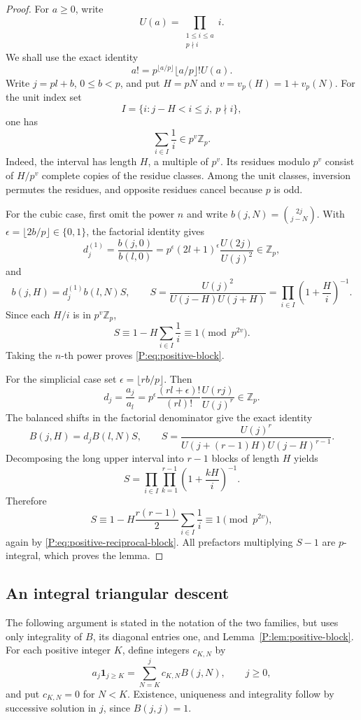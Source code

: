 \documentclass[11pt,a4paper]{article}
\theoremstyle{definition}\newtheorem{definition}[theorem]{Definition}
\theoremstyle{remark}\newtheorem{remark}[theorem]{Remark}
\numberwithin{equation}{section}
\begin{document}
\begin{proof}
For \(a\geq0\), write
\[
 U(a)=\prod_{\substack{1\leq i\leq a\\p\nmid i}}i.
\]
We shall use the exact identity
\[
 a!=p^{\lfloor a/p\rfloor}\lfloor a/p\rfloor!U(a).
\]
Write \(j=pl+b\), \(0\leq b<p\), and put \(H=pN\) and
\(v=v_p(H)=1+v_p(N)\).
For the unit index set
\[
 I=\{i:j-H<i\leq j,\ p\nmid i\},
\]
one has
\begin{equation}\label{P:eq:positive-reciprocal-block}
 \sum_{i\in I}\frac1i\in p^v\mathbb Z_p.
\end{equation}
Indeed, the interval has length \(H\), a multiple of \(p^v\).
Its residues modulo \(p^v\) consist of \(H/p^v\) complete
copies of the residue classes.  Among the unit classes, inversion
permutes the residues, and opposite residues cancel because
\(p\) is odd.

For the cubic case, first omit the power \(n\) and write
\(b(j,N)=\binom{2j}{j-N}\).
With \(\epsilon=\lfloor2b/p\rfloor\in\{0,1\}\), the
factorial identity gives
\[
 d_j^{(1)}=\frac{b(j,0)}{b(l,0)}
 =p^\epsilon(2l+1)^\epsilon\frac{U(2j)}{U(j)^2}
 \in\mathbb Z_p,
\]
and
\[
 b(j,H)=d_j^{(1)}b(l,N)S,\qquad
 S=\frac{U(j)^2}{U(j-H)U(j+H)}
   =\prod_{i\in I}\left(1+\frac H i\right)^{-1}.
\]
Since each \(H/i\) is in \(p^v\mathbb Z_p\),
\[
 S\equiv1-H\sum_{i\in I}\frac1i\equiv1\pmod{p^{2v}}.
\]
Taking the \(n\)-th power proves \eqref{P:eq:positive-block}.

For the simplicial case set \(\epsilon=\lfloor rb/p\rfloor\).
Then
\[
 d_j=\frac{a_j}{a_l}
 =p^\epsilon\frac{(rl+\epsilon)!}{(rl)!}
             \frac{U(rj)}{U(j)^r}\in\mathbb Z_p.
\]
The balanced shifts in the factorial denominator give the exact
identity
\[
 B(j,H)=d_jB(l,N)S,\qquad
 S=\frac{U(j)^r}
 {U(j+(r-1)H)U(j-H)^{r-1}}.
\]
Decomposing the long upper interval into \(r-1\) blocks of
length \(H\) yields
\[
 S=\prod_{i\in I}\prod_{k=1}^{r-1}
          \left(1+\frac{kH}{i}\right)^{-1}.
\]
Therefore
\[
 S\equiv
 1-H\frac{r(r-1)}2\sum_{i\in I}\frac1i
 \equiv1\pmod{p^{2v}},
\]
again by \eqref{P:eq:positive-reciprocal-block}.
All prefactors multiplying \(S-1\) are \(p\)-integral,
which proves the lemma.
\end{proof}

\subsection{An integral triangular descent}

The following argument is stated in the notation of the two
families, but uses only integrality of \(B\), its diagonal entries
one, and Lemma~\ref{P:lem:positive-block}.
For each positive integer \(K\), define integers \(c_{K,N}\) by
\begin{equation}\label{P:eq:positive-triangular}
 a_j\mathbf1_{j\geq K}
 =\sum_{N=K}^{j}c_{K,N}B(j,N),\qquad j\geq0,
\end{equation}
and put \(c_{K,N}=0\) for \(N<K\).
Existence, uniqueness and integrality follow by successive solution
in \(j\), since \(B(j,j)=1\).
\end{document}
